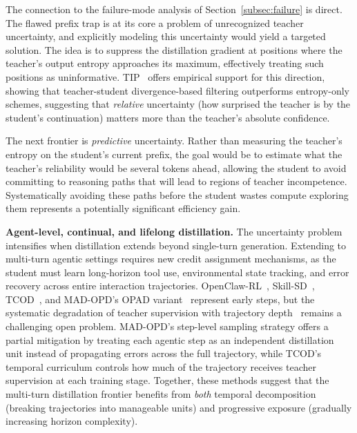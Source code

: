 \documentclass{article} %
\begin{document}
The connection to the failure-mode analysis of Section~\ref{subsec:failure} is direct. The flawed prefix trap is at its core a problem of unrecognized teacher uncertainty, and explicitly modeling this uncertainty would yield a targeted solution. The idea is to suppress the distillation gradient at positions where the teacher's output entropy approaches its maximum, effectively treating such positions as uninformative. TIP~\citep{2604.14084} offers empirical support for this direction, showing that teacher-student divergence-based filtering outperforms entropy-only schemes, suggesting that \emph{relative} uncertainty (how surprised the teacher is by the student's continuation) matters more than the teacher's absolute confidence.

The next frontier is \emph{predictive} uncertainty. Rather than measuring the teacher's entropy on the student's current prefix, the goal would be to estimate what the teacher's reliability would be several tokens ahead, allowing the student to avoid committing to reasoning paths that will lead to regions of teacher incompetence. Systematically avoiding these paths before the student wastes compute exploring them represents a potentially significant efficiency gain.

\textbf{Agent-level, continual, and lifelong distillation.} The uncertainty problem intensifies when distillation extends beyond single-turn generation. Extending to multi-turn agentic settings requires new credit assignment mechanisms, as the student must learn long-horizon tool use, environmental state tracking, and error recovery across entire interaction trajectories. OpenClaw-RL~\citep{2603.10165}, Skill-SD~\citep{2604.10674}, TCOD~\citep{2604.24005}, and MAD-OPD's OPAD variant~\citep{2605.01347} represent early steps, but the systematic degradation of teacher supervision with trajectory depth~\citep{2604.13016} remains a challenging open problem. MAD-OPD's step-level sampling strategy offers a partial mitigation by treating each agentic step as an independent distillation unit instead of propagating errors across the full trajectory, while TCOD's temporal curriculum controls how much of the trajectory receives teacher supervision at each training stage. Together, these methods suggest that the multi-turn distillation frontier benefits from \emph{both} temporal decomposition (breaking trajectories into manageable units) and progressive exposure (gradually increasing horizon complexity).
\end{document}
